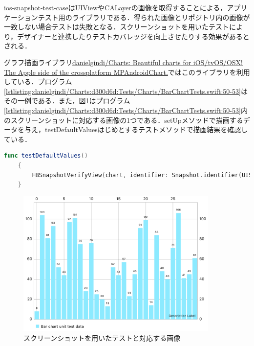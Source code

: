 ios-snapshot-test-caseは{\sf UIView}や{\sf CALayer}の画像を取得することによる，アプリケーションテスト用のライブラリである．得られた画像とリポジトリ内の画像が一致しない場合テストは失敗となる．スクリーンショットを用いたテストにより，デザイナーと連携したりテストカバレッジを向上させたりする効果があるとされる\cite{objc.io:snapshot-testing}．

グラフ描画ライブラリ\href{https://github.com/danielgindi/Charts}{danielgindi/Charts: Beautiful charts for iOS/tvOS/OSX! The Apple side of the crossplatform MPAndroidChart.}ではこのライブラリを利用している．プログラム\ref{lstlisting:danielgindi/Charts:d300d6d:Tests/Charts/BarChartTests.swift:50-53}はその一例である．また，図\ref{figure:danielgindi/Charts:d300d6d:Tests/ReferenceImages_64/ChartsTests.BarChartTests/testDefaultValues_iOS_320.0_568.0@2x.png}はプログラム\ref{lstlisting:danielgindi/Charts:d300d6d:Tests/Charts/BarChartTests.swift:50-53}内のスクリーンショットに対応する画像の1つである．{\sf setUp}メソッドで描画するデータを与え，{\sf testDefaultValues}はじめとするテストメソッドで描画結果を確認している．

\begin{lstlisting}[language=swift,caption=\href{https://github.com/danielgindi/Charts/blob/d300d6d332afa2e790fd616e5a8326e815b0e1f0/Tests/Charts/BarChartTests.swift}{UIライブラリにおけるスクリーンショットを用いたテスト},label=lstlisting:danielgindi/Charts:d300d6d:Tests/Charts/BarChartTests.swift:50-53,firstnumber=50]
    func testDefaultValues()
    {
        FBSnapshotVerifyView(chart, identifier: Snapshot.identifier(UIScreen.main.bounds.size), tolerance: Snapshot.tolerance)
    }
\end{lstlisting}

\begin{figure}
    \centering
    \includegraphics[width=10cm]{images/bodies/thirdparty/case/testDefaultValues.png}
    \caption{スクリーンショットを用いたテストと対応する画像}
    \label{figure:danielgindi/Charts:d300d6d:Tests/ReferenceImages_64/ChartsTests.BarChartTests/testDefaultValues_iOS_320.0_568.0@2x.png}
\end{figure}

